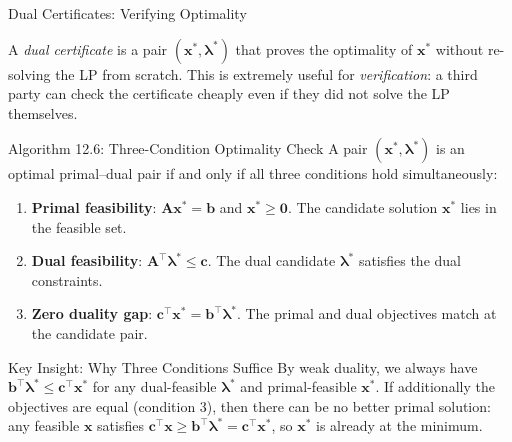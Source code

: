\documentclass[aspectratio=169,10pt]{beamer}
\newcommand{\xv}{\mathbf{x}}
\newcommand{\cv}{\mathbf{c}}
\newcommand{\bv}{\mathbf{b}}
\newcommand{\Av}{\mathbf{A}}
\newcommand{\lav}{\boldsymbol{\lambda}}
\begin{document}
\begin{frame}[allowframebreaks]{Dual Certificates: Verifying Optimality}

A \emph{dual certificate} is a pair $(\xv^*, \lav^*)$ that proves the optimality
of $\xv^*$ without re-solving the LP from scratch.  This is extremely useful for
\emph{verification}: a third party can check the certificate cheaply even if they
did not solve the LP themselves.

\begin{block}{Algorithm 12.6: Three-Condition Optimality Check}
A pair $(\xv^*, \lav^*)$ is an optimal primal--dual pair if and only if all three
conditions hold simultaneously:
\begin{enumerate}
  \item \textbf{Primal feasibility}: $\Av\xv^* = \bv$ and $\xv^* \ge \mathbf{0}$.
        The candidate solution $\xv^*$ lies in the feasible set.
  \item \textbf{Dual feasibility}: $\Av^\top\lav^* \le \cv$.
        The dual candidate $\lav^*$ satisfies the dual constraints.
  \item \textbf{Zero duality gap}: $\cv^\top\xv^* = \bv^\top\lav^*$.
        The primal and dual objectives match at the candidate pair.
\end{enumerate}
\end{block}

\begin{alertblock}{Key Insight: Why Three Conditions Suffice}
By weak duality, we always have $\bv^\top\lav^* \le \cv^\top\xv^*$ for any
dual-feasible $\lav^*$ and primal-feasible $\xv^*$.  If additionally the objectives
are equal (condition 3), then there can be no better primal solution: any feasible
$\xv$ satisfies $\cv^\top\xv \ge \bv^\top\lav^* = \cv^\top\xv^*$, so $\xv^*$ is
already at the minimum.
\end{alertblock}

\framebreak


\end{frame}
\end{document}
